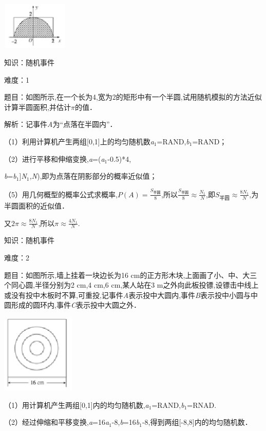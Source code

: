 \documentclass{article} %
\begin{document}
\includegraphics*[width=1.25in, height=0.89in, keepaspectratio=false]{image111}

知识：随机事件

难度：1

题目：如图所示,在一个长为4,宽为2的矩形中有一个半圆,试用随机模拟的方法近似计算半圆面积,并估计$\pi$的值．

解析：记事件\textit{A}为``点落在半圆内''．

（1）利用计算机产生两组[0,1]上的均匀随机数\textit{a}${}_{1}$=RAND,\textit{b}${}_{1}$=RAND；

（2）进行平移和伸缩变换,\textit{a}=(\textit{a}${}_{1}$-0.5)*4,

\textit{b}=\textit{b}${}_{1}$]\textit{N}${}_{1}$\textit{,N}),即为点落在阴影部分的概率近似值；

（5）用几何概型的概率公式求概率,$P(A)=\frac{S_{\text{半圆}}}{8}$,所以$\frac{S_{\text{半圆}}}{8}\approx\frac{N_1}{N}$,即$S_{\text{半圆}}\approx\frac{8N_1}{N}$,为半圆面积的近似值．

又$2\pi\approx\frac{8N_1}{N}$,所以$\pi\approx\frac{4N_1}{N}$.


知识：随机事件

难度：2

题目：如图所示,墙上挂着一块边长为16 cm的正方形木块,上面画了小、中、大三个同心圆,半径分别为2 cm,4 cm,6 cm,某人站在3 m之外向此板投镖,设镖击中线上或没有投中木板时不算,可重投,记事件\textit{A}表示投中大圆内,事件\textit{B}表示投中小圆与中圆形成的圆环内,事件\textit{C}表示投中大圆之外．

\includegraphics*[width=1.38in, height=1.48in, keepaspectratio=false]{image112}

（1）用计算机产生两组[0,1]内的均匀随机数,\textit{a}${}_{1}$=RAND,\textit{b}${}_{1}$=RNAD.

（2）经过伸缩和平移变换,\textit{a}=16\textit{a}${}_{1}$-8,\textit{b}=16\textit{b}${}_{1}$-8,得到两组[-8,8]内的均匀随机数．
\end{document}
